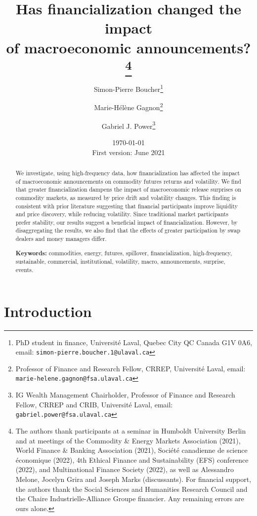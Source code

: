 \documentclass[12pt]{article}
\title{\textbf{Has financialization changed the impact\\ of macroeconomic announcements?}\thanks{The authors thank participants at a seminar in Humboldt University Berlin and at meetings of the Commodity \& Energy Markets Association (2021),  World Finance \& Banking Association (2021), Société canadienne de science  économique (2022), 4th Ethical Finance and Sustainability (EFS) conference (2022), and Multinational Finance Society (2022), as well as Alessandro Melone, Jocelyn Grira and Joseph Marks (discussants). For financial support, the authors thank the Social Sciences and Humanities Research Council and the Chaire Industrielle-Alliance Groupe financier. Any remaining errors are ours alone.}}
\author{Simon-Pierre Boucher\footnote{PhD student in finance, Université Laval, Quebec City QC Canada G1V 0A6, email:   \texttt{simon-pierre.boucher.1@ulaval.ca}}\and Marie-H{\'e}l{\`e}ne Gagnon\footnote{Professor of Finance and Research Fellow, CRREP, Université Laval, email: \texttt{marie-helene.gagnon@fsa.ulaval.ca}}\and Gabriel J. Power\footnote{IG Wealth Management Chairholder, Professor of Finance and Research Fellow, CRREP and CRIB, Université Laval, email:   \texttt{gabriel.power@fsa.ulaval.ca}}
}
\date{ \today \\ First version: June 2021}
\begin{document}
\begin{titlepage}
\maketitle



\singlespacing


\begin{abstract}
\noindent 
 We investigate, using high-frequency data, how financialization has affected the impact of macroeconomic announcements on commodity futures returns and volatility. We find that greater financialization dampens the impact of macroeconomic release surprises on commodity markets, as measured by price drift and volatility changes. This finding is consistent with prior literature suggesting that financial participants improve liquidity and price discovery, while reducing volatility. Since traditional market participants prefer stability, our results suggest a beneficial impact of financialization. However, by disaggregating the results, we also find that the effects of greater participation by swap dealers and money managers differ.%

\vspace{0.2in}
\noindent\textbf{Keywords:} commodities, energy, futures,  spillover, financialization, high-frequency, sustainable, commercial, institutional, volatility, macro, announcements, surprise, events.\\


\bigskip
\end{abstract}
\setcounter{page}{0}
\thispagestyle{empty}
\end{titlepage}
\pagebreak \newpage




\doublespacing

\section{Introduction} \label{sec:introduction}
\end{document}
